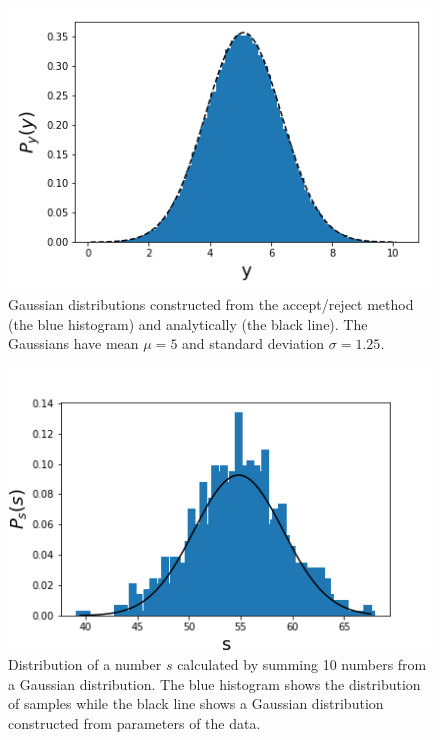 \message{ !name(Assn1.tex)}\documentclass[twocolumn]{article}
\begin{document}
\begin{figure}
\centering
\includegraphics[width=\linewidth]{../Assn1/Gauss_Dist}
\caption{Gaussian distributions constructed from the accept/reject method (the blue histogram) and analytically (the black line). The Gaussians have mean $\mu=5$ and standard deviation $\sigma=1.25$.}
\label{fig:Gauss_Dist}
\end{figure}

\begin{figure}
\centering
\includegraphics[width=\linewidth]{../Assn1/Gauss_sum}
\caption{Distribution of a number $s$ calculated by summing 10 numbers from a Gaussian distribution. The blue histogram shows the distribution of samples while the black line shows a Gaussian distribution constructed from parameters of the data.}
\label{fig:Gauss_sum}
\end{figure}
\end{document}
